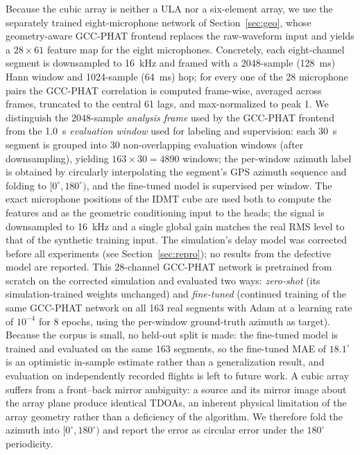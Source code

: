 \documentclass[5p,twocolumn]{elsarticle}
\begin{document}
Because the cubic array is neither a ULA nor a six-element array, we use the separately trained eight-microphone network of Section~\ref{sec:geo}, whose geometry-aware GCC-PHAT frontend replaces the raw-waveform input and yields a $28\times 61$ feature map for the eight microphones. Concretely, each eight-channel segment is downsampled to \SI{16}{\kilo\hertz} and framed with a \SI{2048}{}-sample (\SI{128}{\milli\second}) Hann window and \SI{1024}{}-sample (\SI{64}{\milli\second}) hop; for every one of the 28 microphone pairs the GCC-PHAT correlation is computed frame-wise, averaged across frames, truncated to the central 61 lags, and max-normalized to peak 1. We distinguish the \SI{2048}{}-sample \emph{analysis frame} used by the GCC-PHAT frontend from the \SI{1.0}{\second} \emph{evaluation window} used for labeling and supervision: each \SI{30}{\second} segment is grouped into 30 non-overlapping evaluation windows (after downsampling), yielding $163\times30=4890$ windows; the per-window azimuth label is obtained by circularly interpolating the segment's GPS azimuth sequence and folding to $[0^\circ,180^\circ)$, and the fine-tuned model is supervised per window. The exact microphone positions of the IDMT cube are used both to compute the features and as the geometric conditioning input to the heads; the signal is downsampled to \SI{16}{\kilo\hertz} and a single global gain matches the real RMS level to that of the synthetic training input. The simulation's delay model was corrected before all experiments (see Section~\ref{sec:repro}); no results from the defective model are reported. This 28-channel GCC-PHAT network is pretrained from scratch on the corrected simulation and evaluated two ways: \emph{zero-shot} (its simulation-trained weights unchanged) and \emph{fine-tuned} (continued training of the same GCC-PHAT network on all 163 real segments with Adam at a learning rate of $10^{-4}$ for $8$ epochs, using the per-window ground-truth azimuth as target). Because the corpus is small, no held-out split is made: the fine-tuned model is trained and evaluated on the same 163 segments, so the fine-tuned MAE of $18.1^\circ$ is an optimistic in-sample estimate rather than a generalization result, and evaluation on independently recorded flights is left to future work. A cubic array suffers from a front--back mirror ambiguity: a source and its mirror image about the array plane produce identical TDOAs, an inherent physical limitation of the array geometry rather than a deficiency of the algorithm. We therefore fold the azimuth into $[0^\circ,180^\circ)$ and report the error as circular error under the $180^\circ$\, periodicity.
\end{document}
